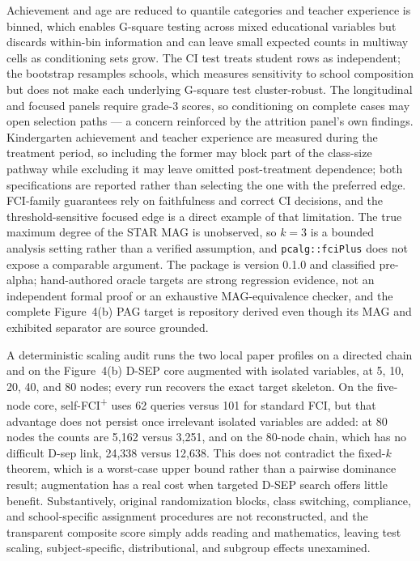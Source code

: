 \documentclass[11pt,a4paper]{article}
\newcommand{\FCIplus}{FCI\textsuperscript{+}}
\newcommand{\code}[1]{\texttt{#1}}
\begin{document}
Achievement and age are reduced to quantile categories and teacher experience is
binned, which enables G-square testing across mixed educational variables but
discards within-bin information and can leave small expected counts in multiway
cells as conditioning sets grow. The CI test treats student rows as independent;
the bootstrap resamples schools, which measures sensitivity to school
composition but does not make each underlying G-square test cluster-robust.
The longitudinal and focused panels require grade-3 scores, so conditioning on
complete cases may open selection paths --- a concern reinforced by the
attrition panel's own findings. Kindergarten achievement and teacher experience
are measured during the treatment period, so including the former may block part
of the class-size pathway while excluding it may leave omitted post-treatment
dependence; both specifications are reported rather than selecting the one with
the preferred edge. FCI-family guarantees rely on faithfulness and correct CI
decisions, and the threshold-sensitive focused edge is a direct example of that
limitation. The true maximum degree of the STAR MAG is unobserved, so \(k = 3\)
is a bounded analysis setting rather than a verified assumption, and
\code{pcalg::fciPlus} does not expose a comparable argument. The package is
version 0.1.0 and classified pre-alpha; hand-authored oracle targets are strong
regression evidence, not an independent formal proof or an exhaustive
MAG-equivalence checker, and the complete Figure~4(b) PAG target is repository
derived even though its MAG and exhibited separator are source grounded.

A deterministic scaling audit runs the two local paper profiles on a directed
chain and on the Figure~4(b) D-SEP core augmented with isolated variables, at 5,
10, 20, 40, and 80 nodes; every run recovers the exact target skeleton. On the
five-node core, self-\FCIplus{} uses 62 queries versus 101 for standard FCI, but
that advantage does not persist once irrelevant isolated variables are added: at
80 nodes the counts are 5,162 versus 3,251, and on the 80-node chain, which has
no difficult D-sep link, 24,338 versus 12,638. This does not contradict the
fixed-\(k\) theorem, which is a worst-case upper bound rather than a pairwise
dominance result; augmentation has a real cost when targeted D-SEP search offers
little benefit. Substantively, original randomization blocks, class switching,
compliance, and school-specific assignment procedures are not reconstructed, and
the transparent composite score simply adds reading and mathematics, leaving
test scaling, subject-specific, distributional, and subgroup effects
unexamined.
\end{document}
